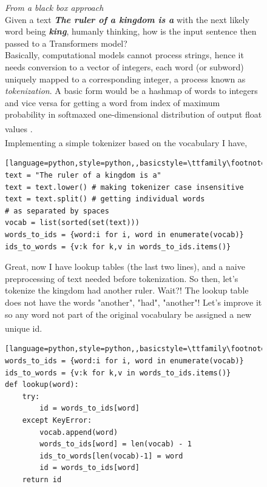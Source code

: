 \documentclass[12pt]{article}
\newcommand{\customtext}[3]{%
    \vspace{#2} %
    \fontsize{13}{8}\textcolor{#1}{\textit{#3}}%
}
\newcommand{\sidecite}[1]{\textsuperscript{\textcolor{blue}{\textbf{\scriptsize#1}}}}
\newcommand{\maincitecount}{\sidecite{\stepcounter{maincite}\themaincite}}
\begin{document}
\pagebreak
\begin{figure}[!htb]
    \begin{minipage}[t]{0.65\textwidth}
    \customtext{xtitle}{0em}{From a black box approach}\\
    Given a text {\small \textit{\textbf{The ruler of a kingdom is a}}} with the next likely word 
    being \textit{\textbf{\small king}}, humanly thinking, how is the input sentence then passed to a 
    Transformers model?\\ 
    Basically, computational models cannot process strings, hence it needs conversion to a vector of integers, each word (or subword) 
    uniquely mapped to a corresponding integer, a process known as {\it tokenization}. A basic form 
    would be a hashmap of words to integers and vice versa for getting a word from index of maximum 
    probability in softmaxed one-dimensional distribution of output float values {\maincitecount}.\\
    \vspace{0.5em}
    Implementing a simple tokenizer based on the vocabulary{\maincitecount} I have, 
\begin{lstlisting}[language=python,style=python,,basicstyle=\ttfamily\footnotesize]
text = "The ruler of a kingdom is a"
text = text.lower() # making tokenizer case insensitive 
text = text.split() # getting individual words 
# as separated by spaces 
vocab = list(sorted(set(text)))
words_to_ids = {word:i for i, word in enumerate(vocab)}
ids_to_words = {v:k for k,v in words_to_ids.items()}
\end{lstlisting}
Great, now I have lookup tables (the last two lines), and a naive preprocessing of text needed 
before tokenization.  So then, let's tokenize \textcolor{xtitle}{the kingdom had another ruler}.
Wait?! The lookup table does not have the words \textcolor{xtitle}{"another", "had", "another"}! 
Let's improve it so any word not part of the original vocabulary be assigned a new unique id{\maincitecount}.
\begin{lstlisting}[language=python,style=python,,basicstyle=\ttfamily\footnotesize]
words_to_ids = {word:i for i, word in enumerate(vocab)}
ids_to_words = {v:k for k,v in words_to_ids.items()}
def lookup(word):
    try: 
        id = words_to_ids[word]
    except KeyError:
        vocab.append(word)
        words_to_ids[word] = len(vocab) - 1
        ids_to_words[len(vocab)-1] = word 
        id = words_to_ids[word]
    return id 
\end{lstlisting}
    \end{minipage}%

\end{figure}
\end{document}

